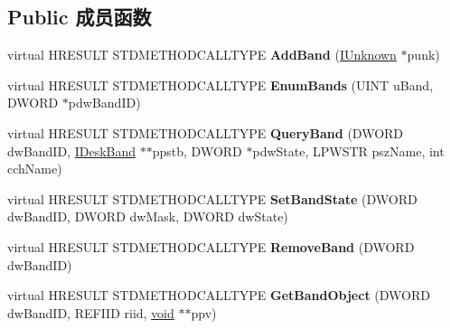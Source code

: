 \subsection*{Public 成员函数}
\begin{DoxyCompactItemize}
\item 
\mbox{\label{class_c_band_site_base_a28f2083c93ab2c708a98dec8adc0b31a}} 
virtual H\+R\+E\+S\+U\+LT S\+T\+D\+M\+E\+T\+H\+O\+D\+C\+A\+L\+L\+T\+Y\+PE {\bfseries Add\+Band} (\hyperlink{interface_i_unknown}{I\+Unknown} $\ast$punk)
\item 
\mbox{\label{class_c_band_site_base_a1dbd4cc9e042a9d5b7f0ddbdcb76e149}} 
virtual H\+R\+E\+S\+U\+LT S\+T\+D\+M\+E\+T\+H\+O\+D\+C\+A\+L\+L\+T\+Y\+PE {\bfseries Enum\+Bands} (U\+I\+NT u\+Band, D\+W\+O\+RD $\ast$pdw\+Band\+ID)
\item 
\mbox{\label{class_c_band_site_base_a57f47da91707bbe473718a3bda62493d}} 
virtual H\+R\+E\+S\+U\+LT S\+T\+D\+M\+E\+T\+H\+O\+D\+C\+A\+L\+L\+T\+Y\+PE {\bfseries Query\+Band} (D\+W\+O\+RD dw\+Band\+ID, \hyperlink{interface_i_desk_band}{I\+Desk\+Band} $\ast$$\ast$ppstb, D\+W\+O\+RD $\ast$pdw\+State, L\+P\+W\+S\+TR psz\+Name, int cch\+Name)
\item 
\mbox{\label{class_c_band_site_base_a8ff5d853cbb17f1a2591c20026fcec5d}} 
virtual H\+R\+E\+S\+U\+LT S\+T\+D\+M\+E\+T\+H\+O\+D\+C\+A\+L\+L\+T\+Y\+PE {\bfseries Set\+Band\+State} (D\+W\+O\+RD dw\+Band\+ID, D\+W\+O\+RD dw\+Mask, D\+W\+O\+RD dw\+State)
\item 
\mbox{\label{class_c_band_site_base_a1942899c52f0c3d98f2dfabcd09b4b5c}} 
virtual H\+R\+E\+S\+U\+LT S\+T\+D\+M\+E\+T\+H\+O\+D\+C\+A\+L\+L\+T\+Y\+PE {\bfseries Remove\+Band} (D\+W\+O\+RD dw\+Band\+ID)
\item 
\mbox{\label{class_c_band_site_base_a93038ba2a0b1c400db8321e5131277ac}} 
virtual H\+R\+E\+S\+U\+LT S\+T\+D\+M\+E\+T\+H\+O\+D\+C\+A\+L\+L\+T\+Y\+PE {\bfseries Get\+Band\+Object} (D\+W\+O\+RD dw\+Band\+ID, R\+E\+F\+I\+ID riid, \hyperlink{interfacevoid}{void} $\ast$$\ast$ppv)
\item 
\mbox{\label{class_c_band_site_base_afb8fe57d69bd8dbd9e85f24d74737a2a}} 

\end{DoxyCompactItemize}
